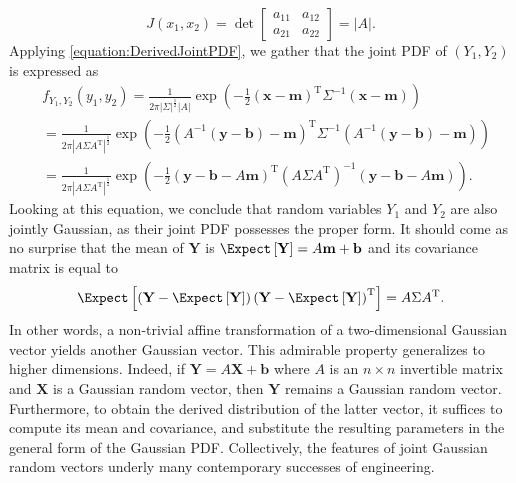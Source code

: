 \begin{example}
\begin{equation*}
J(x_1, x_2)
= \operatorname{det}
\begin{bmatrix} a_{11} & a_{12} \\ a_{21} & a_{22} \end{bmatrix}
= | A | .
\end{equation*}
Applying \eqref{equation:DerivedJointPDF}, we gather that the joint PDF of $(Y_1, Y_2)$ is expressed as
\begin{equation*}
\begin{split}
&f_{Y_1, Y_2} (y_1, y_2)
= \frac{1}{2 \pi |\Sigma|^{\frac{1}{2}} |A|}
\exp \left( - \frac{1}{2}
\left( \mathbf{x} - \mathbf{m} \right)^{\mathrm{T}} \Sigma^{-1} \left( \mathbf{x} - \mathbf{m} \right) \right) \\
&= \frac{1}{2 \pi |A \Sigma A^{\mathrm{T}}|^{\frac{1}{2}}}
\exp \left( - \frac{1}{2}
\left( A^{-1} \left( \mathbf{y} - \mathbf{b} \right) - \mathbf{m} \right)^{\mathrm{T}}
\Sigma^{-1}
\left( A^{-1} \left( \mathbf{y} - \mathbf{b} \right) - \mathbf{m} \right) \right) \\
&= \frac{1}{2 \pi |A \Sigma A^{\mathrm{T}}|^{\frac{1}{2}}}
\exp \left( - \frac{1}{2}
\left( \mathbf{y} - \mathbf{b} - A \mathbf{m} \right)^{\mathrm{T}}
\left( A \Sigma A^{\mathrm{T}} \right)^{-1}
\left( \mathbf{y} - \mathbf{b} - A \mathbf{m} \right) \right) .
\end{split}
\end{equation*}
Looking at this equation, we conclude that random variables $Y_1$ and $Y_2$ are also jointly Gaussian, as their joint PDF possesses the proper form.
It should come as no surprise that the mean of $\mathbf{Y}$ is
$\Expect \left[ \mathbf{Y} \right] = A \mathbf{m} + \mathbf{b}$
and its covariance matrix is equal to
\begin{equation*}
\Expect \left[ \left( \mathbf{Y} - \Expect \left[ \mathbf{Y} \right] \right)
\left( \mathbf{Y} - \Expect \left[ \mathbf{Y} \right] \right)^{\mathrm{T}} \right]
= A \Sigma A^{\mathrm{T}} .
\end{equation*}
In other words, a non-trivial affine transformation of a two-dimensional Gaussian vector yields another Gaussian vector.
This admirable property generalizes to higher dimensions.
Indeed, if $\mathbf{Y} = A \mathbf{X} + \mathbf{b}$ where $A$ is an $n \times n$ invertible matrix and $\mathbf{X}$ is a Gaussian random vector, then $\mathbf{Y}$ remains a Gaussian random vector.
Furthermore, to obtain the derived distribution of the latter vector, it suffices to compute its mean and covariance, and substitute the resulting parameters in the general form of the Gaussian PDF.
Collectively, the features of joint Gaussian random vectors underly many contemporary successes of engineering.
\end{example}


